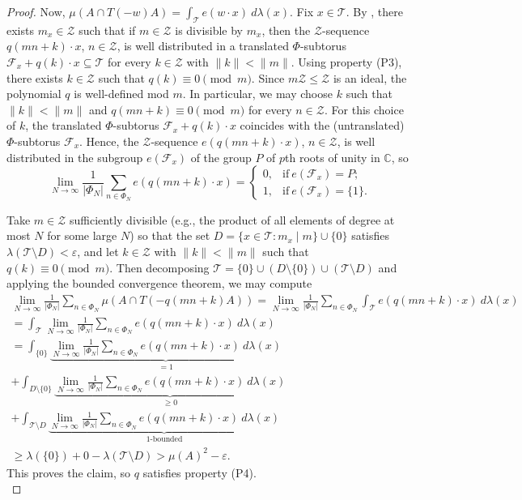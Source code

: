 \documentclass[11pt]{amsart}
\theoremstyle{theorem}
\theoremstyle{definition}
\newcommand{\C}{\mathbb{C}}
\newcommand{\mZ}{\mathcal{Z}}
\newcommand{\mT}{\mathcal{T}}
\newcommand{\mF}{\mathcal{F}}
\newcommand{\eps}{\varepsilon}
\begin{document}
\begin{proof}
	Now, $\mu(A \cap T(-w)A) = \int_{\mT} e(w \cdot x)~d\lambda(x)$.
	Fix $x \in \mT$.
	By \cite[Theorem 8.1]{bl}, there exists $m_x \in \mZ$ such that if $m \in \mZ$ is divisible by $m_x$, then the $\mZ$-sequence $q(mn+k) \cdot x$, $n \in \mZ$, is well distributed in a translated $\Phi$-subtorus $\mF_x + q(k) \cdot x \subseteq \mT$ for every $k \in \mZ$ with $\|k\| < \|m\|$.
	Using property (P3), there exists $k \in \mZ$ such that $q(k) \equiv 0 \pmod{m}$.
	Since $m\mZ \le \mZ$ is an ideal, the polynomial $q$ is well-defined mod $m$.
	In particular, we may choose $k$ such that $\|k\| < \|m\|$ and $q(mn+k) \equiv 0 \pmod{m}$ for every $n \in \mZ$.
	For this choice of $k$, the translated $\Phi$-subtorus $\mF_x + q(k) \cdot x$ coincides with the (untranslated) $\Phi$-subtorus $\mF_x$.
	Hence, the $\mZ$-sequence $e(q(mn+k) \cdot x)$, $n \in \mZ$, is well distributed in the subgroup $e(\mF_x)$ of the group $P$ of $p$th roots of unity in $\C$, so
	\begin{equation*}
		\lim_{N \to \infty} \frac{1}{|\Phi_N|} \sum_{n \in \Phi_N} e(q(mn+k) \cdot x) = \begin{cases}
			0, & \text{if}~e(\mF_x) = P; \\
			1, & \text{if}~e(\mF_x) = \{1\}.
		\end{cases}
	\end{equation*}
	
	Take $m \in \mZ$ sufficiently divisible (e.g., the product of all elements of degree at most $N$ for some large $N$) so that the set $D = \{x \in \mT : m_x \mid m\} \cup \{0\}$ satisfies $\lambda(\mT \setminus D) < \eps$, and let $k \in \mZ$ with $\|k\| < \|m\|$ such that $q(k) \equiv 0 \pmod{m}$.
	Then decomposing $\mT = \{0\} \cup (D \setminus \{0\}) \cup (\mT \setminus D)$ and applying the bounded convergence theorem, we may compute
	\begin{multline*}
		\lim_{N \to \infty} \frac{1}{|\Phi_N|} \sum_{n \in \Phi_N} \mu(A \cap T(-q(mn+k)A)) = \lim_{N \to \infty} \frac{1}{|\Phi_N|} \sum_{n \in \Phi_N} \int_{\mT} e(q(mn+k) \cdot x)~d\lambda(x) \\
		 = \int_{\mT} \lim_{N \to \infty} \frac{1}{|\Phi_N|} \sum_{n \in \Phi_N} e(q(mn+k) \cdot x)~d\lambda(x) \\
		 = \int_{\{0\}} \underbrace{\lim_{N \to \infty} \frac{1}{|\Phi_N|} \sum_{n \in \Phi_N} e(q(mn+k) \cdot x)~d\lambda(x)}_{=1} \\
		 + \int_{D \setminus \{0\}} \underbrace{\lim_{N \to \infty} \frac{1}{|\Phi_N|} \sum_{n \in \Phi_N} e(q(mn+k) \cdot x)~d\lambda(x)}_{\ge 0} \\
		 + \int_{\mT \setminus D} \underbrace{\lim_{N \to \infty} \frac{1}{|\Phi_N|} \sum_{n \in \Phi_N} e(q(mn+k) \cdot x)~d\lambda(x)}_{1\text{-bounded}} \\
		 \ge \lambda(\{0\}) + 0 - \lambda(\mT \setminus D) > \mu(A)^2 - \eps.
	\end{multline*}
	This proves the claim, so $q$ satisfies property (P4). \\
	

\end{proof}
\end{document}
